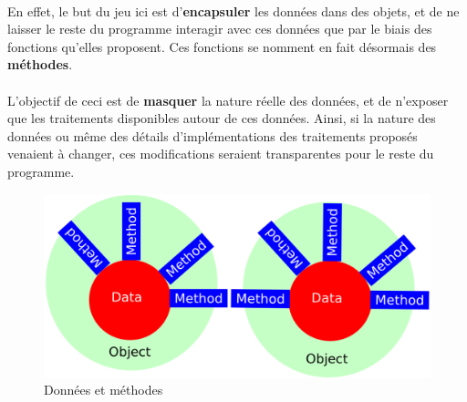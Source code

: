 {  \paragraph{} En effet, le but du jeu ici est d'\textbf{encapsuler} les données dans des objets, et
  de ne laisser le reste du programme interagir avec ces données que par le biais des fonctions
  qu'elles proposent. Ces fonctions se nomment en fait désormais des \textbf{méthodes}.

  \paragraph{} L'objectif de ceci est de \textbf{masquer} la nature réelle des données, et de
  n'exposer que les traitements disponibles autour de ces données. Ainsi, si la nature des données ou
  même des détails d'implémentations des traitements proposés venaient à changer, ces modifications
  seraient transparentes pour le reste du programme.

  \begin{figure}[h]
    \begin{center}
      \includegraphics[scale=0.35]{img/object-and-methods.png}
      \caption{Données et méthodes}
      \label{object-and-methods}
    \end{center}
  \end{figure}
}

